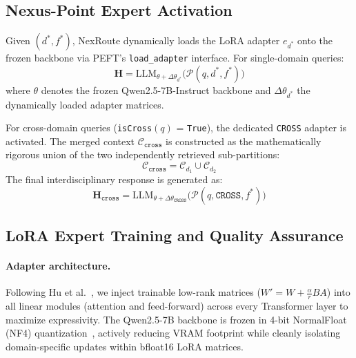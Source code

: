 \documentclass[a4paper,fleql]{cas-sc}
\begin{document}
\subsection{Nexus-Point Expert Activation}
\label{ssec:nexus}
Given $(d^*, f^*)$, NexRoute dynamically loads the LoRA adapter $e_{d^*}$
onto the frozen backbone via PEFT's \texttt{load\_adapter} interface.
For single-domain queries:
\begin{equation}
    \mathbf{H} = \text{LLM}_{\theta + \Delta\theta_{d^*}} \big(
    \mathcal{P}(q, d^*, f^*) \big)
    \label{eq:single}
\end{equation}
where $\theta$ denotes the frozen Qwen2.5-7B-Instruct backbone and
$\Delta\theta_{d^*}$ the dynamically loaded adapter matrices.

For cross-domain queries (\texttt{isCross}$(q)$ = \texttt{True}), the
dedicated \texttt{CROSS} adapter is activated. The merged context
$\mathcal{C}_{\texttt{cross}}$ is constructed as the mathematically rigorous
union of the two independently retrieved sub-partitions:
\begin{equation}
    \mathcal{C}_{\texttt{cross}} = \mathcal{C}_{d_1} \cup \mathcal{C}_{d_2}
    \label{eq:cross_ctx}
\end{equation}
The final interdisciplinary response is generated as:
\begin{equation}
    \mathbf{H}_{\texttt{cross}} = \text{LLM}_{\theta +
    \Delta\theta_{\texttt{CROSS}}}
    \big( \mathcal{P}(q, \texttt{CROSS}, f^*) \big)
    \label{eq:cross_gen}
\end{equation}

\subsection{LoRA Expert Training and Quality Assurance}
\label{ssec:loratrain}
\paragraph{Adapter architecture.}
Following Hu et al.~\citep{hu2022lora}, we inject trainable low-rank matrices ($W' = W + \frac{\alpha}{r} BA$) into all linear modules (attention and feed-forward) across every Transformer layer to maximize expressivity. The Qwen2.5-7B backbone is frozen in 4-bit NormalFloat (NF4) quantization~\citep{dettmers2023qlora}, actively reducing VRAM footprint while cleanly isolating domain-specific updates within bfloat16 LoRA matrices.
\end{document}
